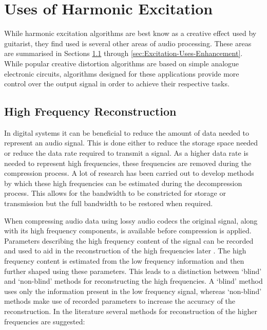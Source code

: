 \section{Uses of Harmonic Excitation}
\label{sec:Excitation-Uses}
	While harmonic excitation algorithms are best know as a creative effect used by guitarist, they find used is several
	other areas of audio processing. These areas are summarised in Sections \ref{sec:Excitation-Uses-Reconstruction}
	through \ref{sec:Excitation-Uses-Enhancement}. While popular creative distortion algorithms are based on simple
	analogue electronic circuits, algorithms designed for these applications provide more control over the output signal
	in order to achieve their respective tasks.

	\subsection{High Frequency Reconstruction}
	\label{sec:Excitation-Uses-Reconstruction}
		In digital systems it can be beneficial to reduce the amount of data needed to represent an audio signal.
		This is done either to reduce the storage space needed or reduce the data rate required to transmit a
		signal. As a higher data rate is needed to represent high frequencies, these frequencies are removed during
		the compression process. A lot of research has been carried out to develop methods by which these high
		frequencies can be estimated during the decompression process. This allows for the bandwidth to be
		constricted for storage or transmission but the full bandwidth to be restored when required.

		When compressing audio data using lossy audio codecs the original signal, along with its high frequency
		components, is available before compression is applied. Parameters describing the high frequency content of
		the signal can be recorded and used to aid in the reconstruction of the high frequencies later
		\citep{dietz2002spectral, friedrich2007spectral}. The high frequency content is estimated from the low
		frequency information and then further shaped using these parameters. This leads to a distinction between
		`blind' and `non-blind' methods for reconstructing the high frequencies. A `blind' method uses only the
		information present in the low frequency signal, whereas `non-blind' methods make use of recorded parameters
		to increase the accuracy of the reconstruction. In the literature several methods for reconstruction of the
		higher frequencies are suggested:

